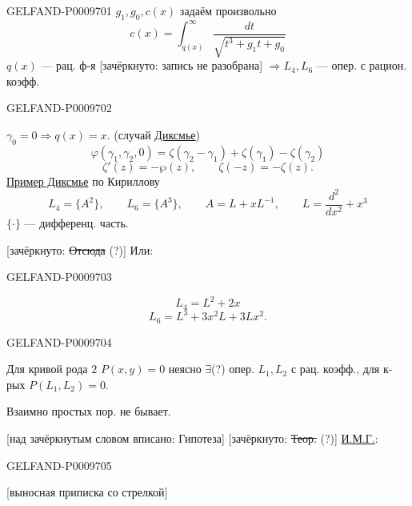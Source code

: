 \begin{GelfandAdjacentEvidence}{GELFAND-P000970}{1}
$g_1,g_0,c(x)$ задаём произвольно
\begin{equation*}
 c(x)=\int_{q(x)}^{\infty}\frac{dt}{\sqrt{t^3+g_1t+g_0}}\tag{4}
\end{equation*}
$q(x)$ --- рац. ф-я [зачёркнуто: запись не разобрана]
$\Rightarrow L_4,L_6$ --- опер. с рацион. коэфф.
\end{GelfandAdjacentEvidence}
\begin{GelfandAdjacentEvidence}{GELFAND-P000970}{2}


$\gamma_0=0\Rightarrow q(x)=x$. (случай \underline{Диксмье})
\[
 \varphi(\gamma_1,\gamma_2,0)=\zeta(\gamma_2-\gamma_1)+\zeta(\gamma_1)-\zeta(\gamma_2)
\]
\[
 \zeta'(z)=-\wp(z),\qquad \zeta(-z)=-\zeta(z).
\]
\underline{Пример Диксмье} по Кириллову
\[
 L_4=\{A^2\},\qquad L_6=\{A^3\},\qquad A=L+xL^{-1},\qquad
 L=\frac{d^2}{dx^2}+x^3
\]
$\{\cdot\}$ --- дифференц. часть.

[зачёркнуто: \sout{Отсюда} (?)] Или:
\end{GelfandAdjacentEvidence}
\begin{GelfandAdjacentEvidence}{GELFAND-P000970}{3}

\[
 L_4=L^2+2x
\]
\[
 L_6=L^3+3x^2L+3Lx^2.
\]
\end{GelfandAdjacentEvidence}
\begin{GelfandAdjacentEvidence}{GELFAND-P000970}{4}


Для кривой рода $2$ $P(x,y)=0$ неясно $\exists$(?) опер.
$L_1,L_2$ с рац. коэфф., для к-рых $P(L_1,L_2)=0$.

Взаимно простых пор. не бывает.

[над зачёркнутым словом вписано: Гипотеза] [зачёркнуто: \sout{Теор.} (?)]
\underline{И.М.Г.}: 
\end{GelfandAdjacentEvidence}
\begin{GelfandAdjacentEvidence}{GELFAND-P000970}{5}


[выносная приписка со стрелкой] 
\end{GelfandAdjacentEvidence}
